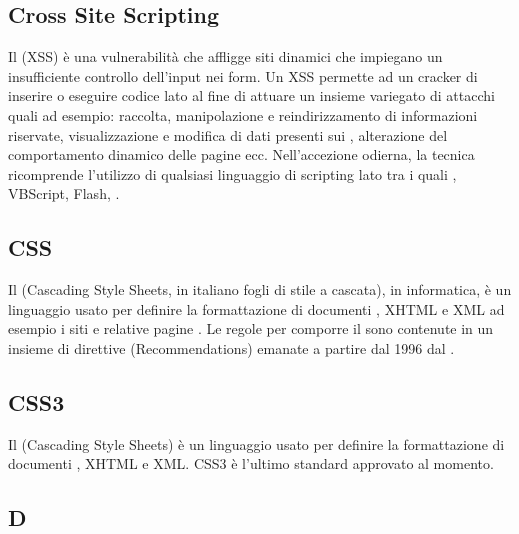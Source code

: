 \subsection{Cross Site Scripting}
Il  (XSS) è una vulnerabilità che affligge siti  dinamici che impiegano un insufficiente controllo dell'input nei form. Un XSS permette ad un cracker di inserire o eseguire codice lato  al fine di attuare un insieme variegato di attacchi quali ad esempio: raccolta, manipolazione e reindirizzamento di informazioni riservate, visualizzazione e modifica di dati presenti sui , alterazione del comportamento dinamico delle pagine  ecc. Nell'accezione odierna, la tecnica ricomprende l'utilizzo di qualsiasi linguaggio di scripting lato  tra i quali , VBScript, Flash, .

\subsection{CSS}
Il  (Cascading Style Sheets, in italiano fogli di stile a cascata), in informatica, è un linguaggio usato per definire la formattazione di documenti , XHTML e XML ad esempio i siti  e relative pagine . Le regole per comporre il  sono contenute in un insieme di direttive (Recommendations) emanate a partire dal 1996 dal .

\subsection{CSS3}
Il  (Cascading Style Sheets) è un linguaggio usato per definire la formattazione di documenti , XHTML e XML.
CSS3 è l'ultimo standard approvato al momento.

\newpage

\begin{center}
\Huge\section{\uppercase{D}}
\end{center}

